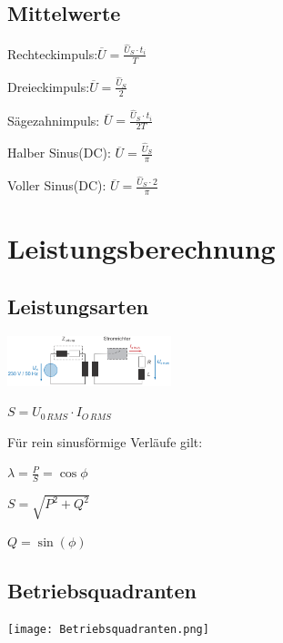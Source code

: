 \documentclass[german]{latex4ei/latex4ei_sheet}
\begin{document}
\begin{sectionbox}
		\subsection{Mittelwerte}
		\begin{bluebox}
			\item Rechteckimpuls:$\overline{U} = \frac{\hat{U}_S\cdot t_i}{T}$
			\item Dreieckimpuls:$\overline{U} = \frac{\hat{U}_S}{2}$
			\item Sägezahnimpuls: $\overline{U} = \frac{\hat{U}_S\cdot t_i}{2T}$
			\item Halber Sinus(DC): $\overline{U}= \frac{\hat{U}_S}{\pi}$
			\item Voller Sinus(DC): $\overline{U} = \frac{\hat{U}_S\cdot 2}{\pi}$
		\end{bluebox}
	\end{sectionbox}
\section{Leistungsberechnung}
	\begin{sectionbox}
		\subsection{Leistungsarten}
			\begin{bluebox}
				\item \includegraphics[width=180px]{img/Leistungsarten.png}
				\item $S = U_{0\,RMS} \cdot I_{O\,RMS}$
				\item Für rein sinusförmige Verläufe gilt:
				\item $\lambda = \frac{P}{S} = \cos \phi$
				\item $S = \sqrt{P^2+Q^2}$
				\item $Q = \sin(\phi)$
			\end{bluebox}
		\subsection{Betriebsquadranten}
			\begin{symbolbox}
				\item \texttt{[image: Betriebsquadranten.png]}
			\end{symbolbox}
	\end{sectionbox}
\end{document}
